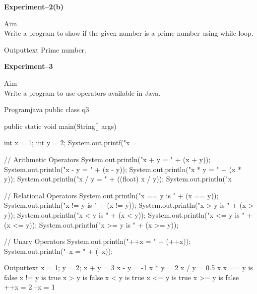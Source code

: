 \documentclass[11pt]{ipu-ai}
\renewcommand{\experiment}[2]{%
    \begin{center}%
        \textbf{\Huge Experiment--#1}\\[30pt]%
    \end{center}%
    \begin{tabularsection}{Aim}%
        ~\\#2\\%
    \end{tabularsection}}
\begin{document}
    \experiment{2(b)}{Write a program to show if the given number is a prime number using while loop.}%
    \begin{code}
        {Output}{text}
Prime number.
    \end{code}


    \experiment{3}{Write a program to use operators available in Java.}%
    \begin{code}
        {Program}{java}
public class q3 {
    public static void main(String[] args) {
        int x = 1;
        int y = 2;
        System.out.printf("x = %

        // Arithmetic Operators
        System.out.println("x + y = " + (x + y));
        System.out.println("x - y = " + (x - y));
        System.out.println("x * y = " + (x * y));
        System.out.println("x / y = " + ((float) x / y));
        System.out.println("x %

        // Relational Operators
        System.out.println("x == y is " + (x == y));
        System.out.println("x != y is " + (x != y));
        System.out.println("x > y is " + (x > y));
        System.out.println("x < y is " + (x < y));
        System.out.println("x <= y is " + (x <= y));
        System.out.println("x >= y is " + (x >= y));

        // Unary Operators
        System.out.println("++x = " + (++x));
        System.out.println("--x = " + (--x));
    }
}
    \end{code}%
    \begin{code}
        {Output}{text}
x = 1; y = 2;
x + y = 3
x - y = -1
x * y = 2
x / y = 0.5
x %
x == y is false
x != y is true
x > y is false
x < y is true
x <= y is true
x >= y is false
++x = 2
--x = 1
    \end{code}

\end{document}
